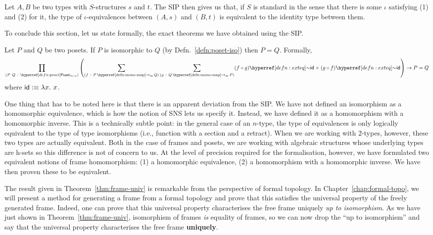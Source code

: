 Let $A, B$ be two types with $S$-structures $s$ and $t$. The SIP then gives us that, if
$S$ is standard in the sense that there is some $\iota$ satisfying (1) and (2) for it, the
type of $\iota$-equivalences between $(A, s)$ and $(B, t)$ is equivalent to the identity type
between them.

To conclude this section, let us state formally, the exact theorems we have obtained using
the SIP.

\begin{thm}
  Let $P$ and $Q$ be two posets. If $P$ is isomorphic to $Q$
  (by Defn.~\ref{defn:poset-iso}) then $P = Q$. Formally,
  \begin{equation*}
    \pity{P~Q}{\poset{}_{m, n}}{%
      \left(
        \sigmaty{f}{\mono{P}{Q}}{\sigmaty{g}{\mono{Q}{P}}{%
            \exteq{(f \circ g)}{\mathsf{id}} \times \exteq{(g \circ f)}{\mathsf{id}}
          }
        }
      \right)
      \rightarrow P = Q
    }
  \end{equation*}
  where $\mathsf{id} :\equiv \lambda x.~x$.
\end{thm}

\begin{thm}\label{thm:frame-univ}
\end{thm}

One thing that has to be noted here is that there is an apparent deviation from the SIP.
We have not defined an isomorphism as a homomorphic equivalence, which is how the notion
of SNS lets us specify it. Instead, we have defined it as a homomorphism with a
homomorphic inverse. This is a technically subtle point: in the general case of an
$n$-type, the type of equivalences is only logically equivalent to the type of type
isomorphisms (i.e., function with a section and a retract). When we are working with
$2$-types, however, these two types are actually equivalent. Both in the case of frames
and posets, we are working with algebraic structures whose underlying types are h-sets so
this difference is not of concern to us. At the level of precision required for the
formalisation, however, we have formulated two equivalent notions of frame homomorphism:
(1) a homomorphic equivalence, (2) a homomorphism with a homomorphic inverse. We have then
proven these to be equivalent.

The result given in Theorem~\ref{thm:frame-univ} is remarkable from the perspective of
formal topology. In Chapter~\ref{chap:formal-topo}, we will present a method for
generating a frame from a formal topology and prove that this satisfies the universal
property of the freely generated frame. Indeed, one can prove that this universal property
characterises the free frame uniquely \emph{up to isomorphism}. As we have just shown in
Theorem~\ref{thm:frame-univ}, isomorphism of frames \emph{is} equality of frames, so we
can now drop the ``up to isomorphism'' and say that the universal property characterises
the free frame \textbf{uniquely}.


